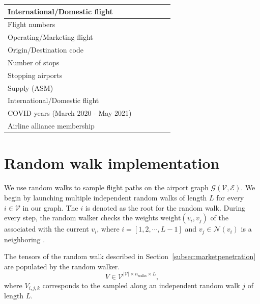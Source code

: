 \begin{table}[h!]
\begin{tabular}{|L{5cm}|C{2cm}|C{2cm}|C{2cm}|C{2cm}|C{2cm}|}
	International/Domestic flight			 		& 		 										&				&							&					& \cmark	\\ \hline\hline
	Flight numbers 									& 			& \cmark		& 							& 					& 			\\ 
	Operating/Marketing flight						& 												& \cmark		& 							& 					& 			\\ 
	Origin/Destination code							& 							 					& \cmark		& 							& 					& 			\\ 
	Number of stops									& 							 					& \cmark		& 							& 					& 			\\ 
	Stopping airports								& 							 					& \cmark		& 							& 					& 			\\ 
	Supply (\acs{ASM})								& 												& \cmark		& 							& 					& 			\\ 
	International/Domestic flight			 		& 		 										& 				& 							& 					& \cmark 	\\ \hline\hline
	COVID years (March 2020 - May 2021)				&  				& 				& \cmark					& \cmark			& 			\\ 
	Airline alliance membership						& 												& 				& \cmark					& \cmark			& 			\\ 
	\hline\hline
	\end{tabular}
\end{table}

\section{Random walk implementation} \label{sec:randomwalker}

We use random walks to sample flight paths on the airport graph $\mathcal{G}(\mathcal{V},\mathcal{E})$. We begin by launching multiple independent random walks of length $L$ for every $i \in \mathcal{V}$ in our graph. The  $i$ is denoted as the root  for the random walk. During every step, the random walker checks the weights $\text{weight}(v_i,v_j)$ of the  associated with the current  $v_i$, where $i = \left[1,2,\cdots,L-1\right]$ and $v_j \in \mathcal{N}(v_i)$ is a neighboring .

The tensors of the random walk described in Section~\ref{subsec:marketpenetration} are populated by the random walker.
%
\begin{equation}
	{V} \in \mathcal{V}^{\lvert\mathcal{V}\rvert\times n_\text{walks} \times L},
\end{equation}
%
where ${V}_{i,j,k}$ corresponds to the sampled  along an independent random walk $j$ of length $L$.

